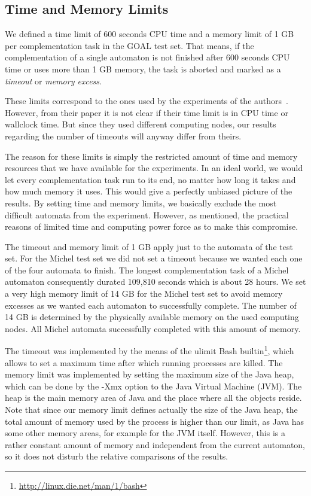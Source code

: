 \subsection{Time and Memory Limits}
We defined a time limit of 600 seconds CPU time and a memory limit of 1 GB per complementation task in the GOAL test set. That means, if the complementation of a single automaton is not finished after 600 seconds CPU time or uses more than 1 GB memory, the task is aborted and marked as a \textit{timeout} or \textit{memory excess}.

These limits correspond to the ones used by the experiments of the \goal{} authors~\cite{2011_tsai}. However, from their paper it is not clear if their time limit is in CPU time or wallclock time. But since they used different computing nodes, our results regarding the number of timeouts will anyway differ from theirs.

The reason for these limits is simply the restricted amount of time and memory resources that we have available for the experiments. In an ideal world, we would let every complementation task run to its end, no matter how long it takes and how much memory it uses. This would give a perfectly unbiased picture of the results. By setting time and memory limits, we basically exclude the most difficult automata from the experiment. However, as mentioned, the practical reasons of limited time and computing power force as to make this compromise.

The timeout and memory limit of 1 GB apply just to the automata of the \goal{} test set. For the Michel test set we did not set a timeout because we wanted each one of the four automata to finish. The longest complementation task of a Michel automaton consequently durated 109,810 seconds which is about 28 hours. We set a very high memory limit of 14 GB for the Michel test set to avoid memory excesses as we wanted each automaton to successfully complete. The number of 14 GB is determined by the physically available memory on the used computing nodes. All Michel automata successfully completed with this amount of memory.

The timeout was implemented by the means of the \textsf{ulimit} Bash builtin\footnote{\url{http://linux.die.net/man/1/bash}}, which allows to set a maximum time after which running processes are killed. The memory limit was implemented by setting the maximum size of the Java heap, which can be done by the \textsf{-Xmx} option to the Java Virtual Machine (JVM). The heap is the main memory area of Java and the place where all the objects reside. Note that since our memory limit defines actually the size of the Java heap, the total amount of memory used by the process is higher than our limit, as Java has some other memory areas, for example for the JVM itself. However, this is a rather constant amount of memory and independent from the current automaton, so it does not disturb the relative comparisons of the results.

